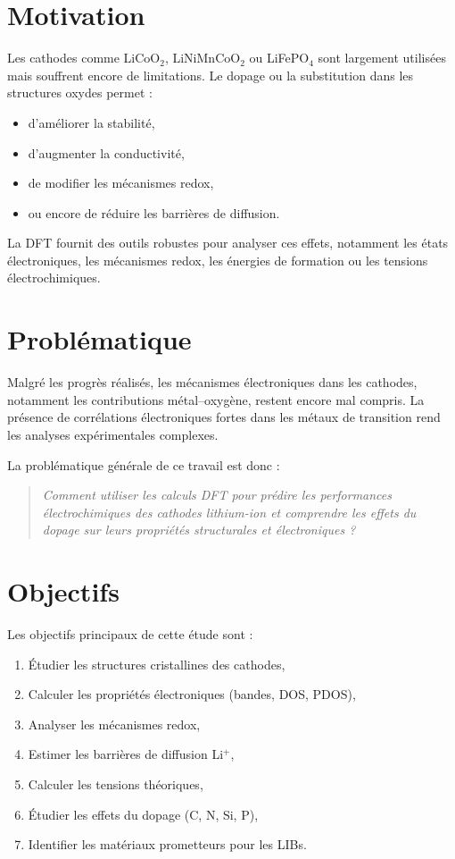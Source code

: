\documentclass[12pt,a4paper]{report}
\begin{document}
\section{Motivation}

Les cathodes comme LiCoO$_2$, LiNiMnCoO$_2$ ou LiFePO$_4$ 
sont largement utilisées mais souffrent encore de limitations.
Le dopage ou la substitution dans les structures oxydes permet :
\begin{itemize}
    \item d’améliorer la stabilité,
    \item d’augmenter la conductivité,
    \item de modifier les mécanismes redox,
    \item ou encore de réduire les barrières de diffusion.
\end{itemize}

La DFT fournit des outils robustes pour analyser ces effets,
notamment les états électroniques, les mécanismes redox,
les énergies de formation ou les tensions électrochimiques.

\section{Problématique}

Malgré les progrès réalisés,
les mécanismes électroniques dans les cathodes,
notamment les contributions métal–oxygène,
restent encore mal compris.
La présence de corrélations électroniques fortes dans les métaux de transition
rend les analyses expérimentales complexes.

La problématique générale de ce travail est donc :

\begin{quote}
\textit{Comment utiliser les calculs DFT pour prédire les performances électrochimiques 
des cathodes lithium-ion et comprendre les effets du dopage sur leurs propriétés structurales et électroniques ?}
\end{quote}

\section{Objectifs}

Les objectifs principaux de cette étude sont :
\begin{enumerate}
    \item Étudier les structures cristallines des cathodes,
    \item Calculer les propriétés électroniques (bandes, DOS, PDOS),
    \item Analyser les mécanismes redox,
    \item Estimer les barrières de diffusion Li$^+$,
    \item Calculer les tensions théoriques,
    \item Étudier les effets du dopage (C, N, Si, P),
    \item Identifier les matériaux prometteurs pour les LIBs.
\end{enumerate}
\end{document}
